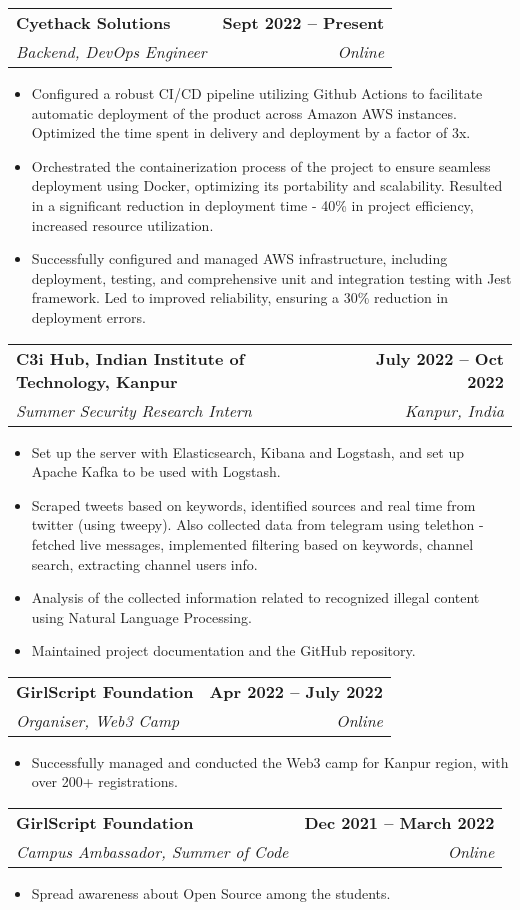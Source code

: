 \documentclass[a4paper,20pt]{article}
\makeatletter
\newcommand{\resumeItem}[1]{
  \item\small{
    {#1 \vspace{-2pt}}
  }
}
\newcommand{\resumeSubheading}[4]{
  \vspace{-2pt}\item
    \begin{tabular*}{1.0\textwidth}[t]{l@{\extracolsep{\fill}}r}
      \textbf{#1} & \textbf{\small #2} \\
      \textit{\small#3} & \textit{\small #4} \\
    \end{tabular*}\vspace{-7pt}
}
\newcommand{\resumeItemListStart}{\begin{itemize}}
\newcommand{\resumeItemListEnd}{\end{itemize}\vspace{-5pt}}
\makeatother
\begin{document}
    \resumeSubheading
      {Cyethack Solutions }{Sept 2022 -- Present}
      {Backend, DevOps Engineer}{Online}
      \resumeItemListStart
        \resumeItem{Configured a robust CI/CD pipeline utilizing Github Actions to facilitate automatic deployment of the product across Amazon AWS instances. Optimized the time spent in delivery and deployment by a factor of 3x. }
        \resumeItem{Orchestrated the containerization process of the project to ensure seamless deployment using Docker, optimizing its portability and scalability. Resulted in a significant reduction in deployment time - 40\% in project efficiency, increased resource utilization.}
        \resumeItem{Successfully configured and managed AWS infrastructure, including deployment, testing, and comprehensive unit and integration testing with Jest framework. Led to improved reliability, ensuring a 30\% reduction in deployment errors.}
    \resumeItemListEnd
    
    \resumeSubheading
      {C3i Hub, Indian Institute of Technology, Kanpur }{July 2022 -- Oct 2022}
      {Summer Security Research Intern}{Kanpur, India}
      \resumeItemListStart
        \resumeItem{Set up the server with Elasticsearch, Kibana and Logstash, and set up Apache Kafka to be used with Logstash. }
        \resumeItem{Scraped tweets based on keywords, identified sources and real time from twitter (using tweepy). Also collected data from telegram using telethon - fetched live messages, implemented filtering based on keywords, channel search, extracting channel users info.}
        \resumeItem{Analysis of the collected information related to recognized illegal content using Natural Language Processing. }
        \resumeItem{Maintained project documentation and the GitHub repository. }
    \resumeItemListEnd
    
    \resumeSubheading
      {GirlScript Foundation}{Apr 2022 -- July 2022}
      {Organiser, Web3 Camp}{Online}
      \resumeItemListStart
        \resumeItem{Successfully managed and conducted the Web3 camp for Kanpur region, with over 200+ registrations.}
    \resumeItemListEnd
    
    \resumeSubheading
      {GirlScript Foundation}{ Dec 2021 -- March 2022}
      {Campus Ambassador, Summer of Code}{Online}
      \resumeItemListStart
        \resumeItem{Spread awareness about Open Source among the students.}
    \resumeItemListEnd
    
    
\end{document}
